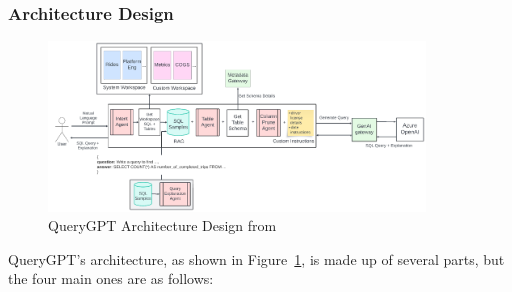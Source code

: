         \subsubsection{Architecture Design}
        \begin{figure}[H]
            \centering
            \includegraphics[width=10cm]{chapters/2/figures/query-gpt-architecture.png}
            \caption[QueryGPT Architecture Design]{QueryGPT Architecture Design  from~\cite{QueryGPT}}
            \label{fig:query-gpt-architecture}
        \end{figure}
        QueryGPT's architecture, as shown in Figure~\ref{fig:query-gpt-architecture}, is made up of several parts, but the four main ones are as follows:
\pagebreak
